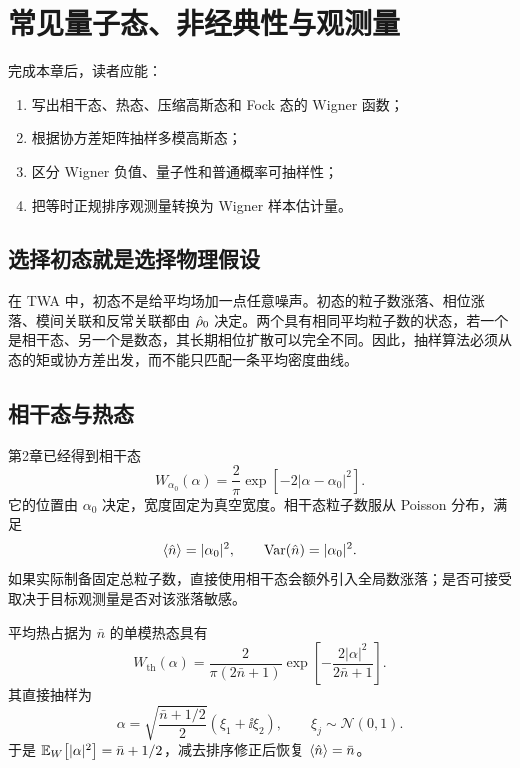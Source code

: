 \chapter{常见量子态、非经典性与观测量}
\label{ch:states-observables}

\begin{learningobjectives}
完成本章后，读者应能：
\begin{enumerate}
  \item 写出相干态、热态、压缩高斯态和 Fock 态的 Wigner 函数；
  \item 根据协方差矩阵抽样多模高斯态；
  \item 区分 Wigner 负值、量子性和普通概率可抽样性；
  \item 把等时正规排序观测量转换为 Wigner 样本估计量。
\end{enumerate}
\end{learningobjectives}

\section{选择初态就是选择物理假设}

在 TWA 中，初态不是给平均场加一点任意噪声。初态的粒子数涨落、相位涨落、模间关联和反常关联都由 $\hat\rho_0$ 决定。两个具有相同平均粒子数的状态，若一个是相干态、另一个是数态，其长期相位扩散可以完全不同。因此，抽样算法必须从态的矩或协方差出发，而不能只匹配一条平均密度曲线。

\section{相干态与热态}

第2章已经得到相干态
\begin{equation}
  W_{\alpha_0}(\alpha)=\frac{2}{\pi}
  \exp[-2|\alpha-\alpha_0|^2].
\end{equation}
它的位置由 $\alpha_0$ 决定，宽度固定为真空宽度。相干态粒子数服从 Poisson 分布，满足
\begin{equation}
  \left\langle \hat n\right\rangle=|\alpha_0|^2,
  \qquad
  \operatorname{Var}(\hat n)=|\alpha_0|^2.
\end{equation}
如果实际制备固定总粒子数，直接使用相干态会额外引入全局数涨落；是否可接受取决于目标观测量是否对该涨落敏感。

平均热占据为 $\bar n$ 的单模热态具有
\begin{equation}
  W_{\mathrm{th}}(\alpha)
  =\frac{2}{\pi(2\bar n+1)}
  \exp\!\left[-\frac{2|\alpha|^2}{2\bar n+1}\right].
  \label{eq:thermal-wigner}
\end{equation}
其直接抽样为
\begin{equation}
  \alpha=\sqrt{\frac{\bar n+1/2}{2}}
  (\xi_1+\ii\xi_2),
  \qquad \xi_j\sim\mathcal{N}(0,1).
  \label{eq:thermal-sampling}
\end{equation}
于是 $\mathbb{E}_{W}\!\left[|\alpha|^2\right]=\bar n+1/2$，减去排序修正后恢复 $\left\langle \hat n\right\rangle=\bar n$。

